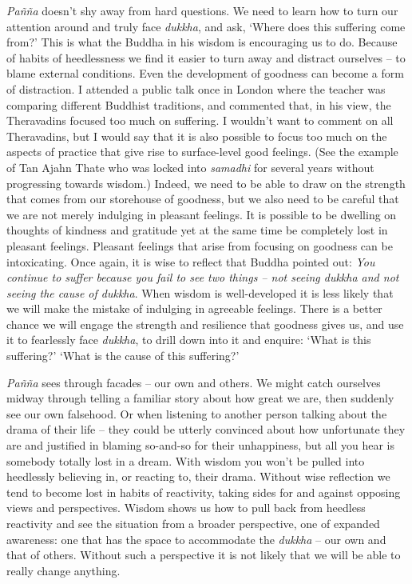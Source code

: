 \emph{Pañña} doesn't shy away from hard questions. We need to learn how
to turn our attention around and truly face \emph{dukkha}, and ask,
`Where does this suffering come from?' This is what the Buddha in his
wisdom is encouraging us to do. Because of habits of heedlessness we
find it easier to turn away and distract ourselves -- to blame external
conditions. Even the development of goodness can become a form of
distraction. I attended a public talk once in London where the teacher
was comparing different Buddhist traditions, and commented that, in his
view, the Theravadins focused too much on suffering. I wouldn't want to
comment on all Theravadins, but I would say that it is also possible to
focus too much on the aspects of practice that give rise to
surface-level good feelings. (See the example of Tan Ajahn Thate who was
locked into \emph{samadhi} for several years without progressing towards
wisdom.) Indeed, we need to be able to draw on the strength that comes
from our storehouse of goodness, but we also need to be careful that we
are not merely indulging in pleasant feelings. It is possible to be
dwelling on thoughts of kindness and gratitude yet at the same time be
completely lost in pleasant feelings. Pleasant feelings that arise from
focusing on goodness can be intoxicating. Once again, it is wise to
reflect that Buddha pointed out: \emph{You continue to suffer because
you fail to see two things -- not seeing dukkha and not seeing the cause
of dukkha}. When wisdom is well-developed it is less likely that we will
make the mistake of indulging in agreeable feelings. There is a better
chance we will engage the strength and resilience that goodness gives
us, and use it to fearlessly face \emph{dukkha}, to drill down into it
and enquire: `What is this suffering?' `What is the cause of this
suffering?'

\emph{Pañña} sees through facades -- our own and others. We might catch
ourselves midway through telling a familiar story about how great we
are, then suddenly see our own falsehood. Or when listening to another
person talking about the drama of their life -- they could be utterly
convinced about how unfortunate they are and justified in blaming
so-and-so for their unhappiness, but all you hear is somebody totally
lost in a dream. With wisdom you won't be pulled into heedlessly
believing in, or reacting to, their drama. Without wise reflection we
tend to become lost in habits of reactivity, taking sides for and
against opposing views and perspectives. Wisdom shows us how to pull
back from heedless reactivity and see the situation from a broader
perspective, one of expanded awareness: one that has the space to
accommodate the \emph{dukkha} -- our own and that of others. Without
such a perspective it is not likely that we will be able to really
change anything.

